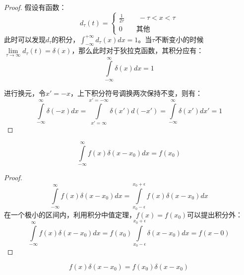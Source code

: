 \documentclass[11pt]{article}
\begin{document}
\begin{proof}
    假设有函数：
    \begin{equation*}
        d_\tau(t) = 
        \begin{cases}
            \frac{1}{2\tau} \qquad -\tau<x<\tau \\
            0 \qquad \text{其他}
        \end{cases}
    \end{equation*}
    此时可以发现$d_\tau$的积分，$\int^{+\infty}_{-\infty} d_\tau(x) dx = 1$。当$\tau$不断变小的时候$\lim\limits_{\tau \rightarrow \infty} d_{\tau}(t) = \delta(x)$，那么此时对于狄拉克函数，其积分应有：
    \begin{equation*}
        \int\limits^{\infty}_{-\infty} \delta(x) dx =1
    \end{equation*}

    进行换元，令$x'=-x$，上下积分符号调换两次保持不变，则有：
    \begin{equation*}
        \int\limits^{\infty}_{-\infty} \delta(-x) dx =
        \int\limits^{x'= -\infty}_{x'= \infty} \delta(x') d(-x') =
        \int\limits^{\infty}_{-\infty} \delta(x') dx' = 1
    \end{equation*}
\end{proof}

\begin{corollary}
    \begin{equation*}
        \int\limits^{\infty}_{-\infty} f(x) \delta(x-x_0) dx = f(x_0)
    \end{equation*}
\end{corollary}

\begin{proof}
    \begin{equation*}
        \int\limits^{\infty}_{-\infty} f(x) \delta(x-x_0) dx
        = \int\limits^{x_0+\epsilon}_{x_0-\epsilon} f(x) \delta(x-x_0) dx
    \end{equation*}
    在一个极小的区间内，利用积分中值定理，$f(x)=f(x_0)$可以提出积分外：
    \begin{equation*}
        \int\limits^{\infty}_{-\infty} f(x) \delta(x-x_0) dx
        = f(x_0)\int\limits^{x_0+\epsilon}_{x_0-\epsilon} \delta(x-x_0) dx
        = f(x-0)
    \end{equation*}
\end{proof}

\begin{corollary}
    \begin{equation*}
        f(x)\delta(x-x_0) = f(x_0)\delta(x-x_0)        
    \end{equation*}
\end{corollary}
\end{document}
